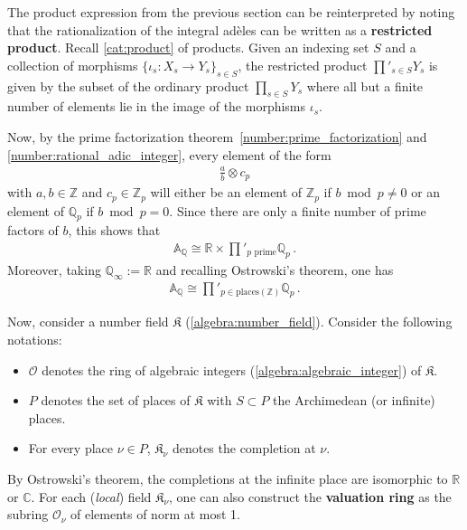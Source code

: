     The product expression from the previous section can be reinterpreted by noting that the rationalization of the integral ad\`eles can be written as a \textbf{restricted product}. Recall \cref{cat:product} of products. Given an indexing set $S$ and a collection of morphisms $\{\iota_s:X_s\rightarrow Y_s\}_{s\in S}$, the restricted product $\prod'_{s\in S}Y_s$ is given by the subset of the ordinary product $\prod_{s\in S}Y_s$ where all but a finite number of elements lie in the image of the morphisms $\iota_s$.

    Now, by the prime factorization theorem~\ref{number:prime_factorization} and \cref{number:rational_adic_integer}, every element of the form
    \begin{gather}
        \frac{a}{b}\otimes c_p
    \end{gather}
    with $a,b\in\mathbb{Z}$ and $c_p\in\mathbb{Z}_p$ will either be an element of $\mathbb{Z}_p$ if $b\bmod p\neq0$ or an element of $\mathbb{Q}_p$ if $b\bmod p=0$. Since there are only a finite number of prime factors of $b$, this shows that
    \begin{gather}
        \mathbb{A}_{\mathbb{Q}}\cong\mathbb{R}\times\prod'_{p\text{ prime}}\mathbb{Q}_p\,.
    \end{gather}
    Moreover, taking $\mathbb{Q}_\infty:=\mathbb{R}$ and recalling Ostrowski's theorem, one has
    \begin{gather}
        \mathbb{A}_{\mathbb{Q}}\cong\prod'_{p\in\mathrm{places}(\mathbb{Z})}\mathbb{Q}_p\,.
    \end{gather}

    Now, consider a number field $\mathfrak{K}$ (\cref{algebra:number_field}). Consider the following notations:
    \begin{itemize}
        \item $\mathcal{O}$ denotes the ring of algebraic integers (\cref{algebra:algebraic_integer}) of $\mathfrak{K}$.
        \item $P$ denotes the set of places of $\mathfrak{K}$ with $S\subset P$ the Archimedean (or infinite) places.
        \item For every place $\nu\in P$, $\mathfrak{K}_\nu$ denotes the completion at $\nu$.
    \end{itemize}
    By Ostrowski's theorem, the completions at the infinite place are isomorphic to $\mathbb{R}$ or $\mathbb{C}$. For each (\textit{local}) field $\mathfrak{K}_\nu$, one can also construct the \textbf{valuation ring} as the subring $\mathcal{O}_\nu$ of elements of norm at most 1.

